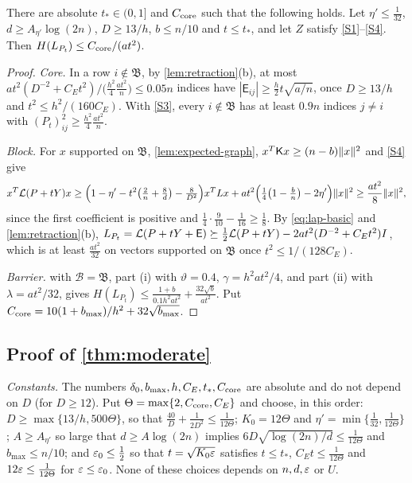 \begin{lemma}\label{lem:seed-graph}
There are absolute $t_*\in(0,1]$ and $C_{\rm core}$ such that the following
holds. Let $\eta'\le\frac1{32}$, $d\ge A_{\eta'}\log(2n)$, $D\ge13/h$,
$b\le n/10$ and $t\le t_*$, and let $Z$ satisfy \ref{S1}--\ref{S4}. Then
$H(L_{P_t})\le C_{\rm core}/(at^2)$.
\end{lemma}

\begin{proof}
\emph{Core.} In a row $i\notin\mathfrak B$, by \cref{lem:retraction}(b), at most
$at^2(D^{-2}+C_Et^2)\big/\bigl(\frac{h^2}4\frac{at^2}n\bigr)\le0.05n$ indices have
$|\mathsf E_{ij}|\ge\frac h2t\sqrt{a/n}$, once $D\ge13/h$ and
$t^2\le h^2/(160C_E)$. With \ref{S3}, every $i\notin\mathfrak B$ has at least
$0.9n$ indices $j\ne i$ with $(P_t)_{ij}^2\ge\frac{h^2}4\frac{at^2}n$.

\emph{Block.} For $x$ supported on $\mathfrak B$, \cref{lem:expected-graph},
$x^T\mathsf Kx\ge(n-b)\lVert x\rVert^2$ and \ref{S4} give
\[
 x^T\mathcal L(P+tY)x\ge\Bigl(1-\eta'-t^2\bigl(\tfrac2n+\tfrac8d\bigr)-\tfrac8{D^2}\Bigr)x^TLx
 +at^2\Bigl(\tfrac14\bigl(1-\tfrac bn\bigr)-2\eta'\Bigr)\lVert x\rVert^2
 \ge\frac{at^2}8\lVert x\rVert^2 ,
\]
since the first coefficient is positive and $\frac14\cdot\frac9{10}-\frac1{16}\ge\frac18$.
By \eqref{eq:lap-basic} and \cref{lem:retraction}(b),
$L_{P_t}=\mathcal L(P+tY+\mathsf E)\succeq\frac12\mathcal L(P+tY)-2at^2(D^{-2}+C_Et^2)I$,
which is at least $\frac{at^2}{32}$ on vectors supported on $\mathfrak B$ once
$t^2\le1/(128C_E)$.

\emph{Barrier.}  with $\mathcal B=\mathfrak B$, part (i) with
$\vartheta=0.4$, $\gamma=h^2at^2/4$, and part (ii) with $\lambda=at^2/32$, gives
$H(L_{P_t})\le\frac{1+b}{0.1h^2at^2}+\frac{32\sqrt b}{at^2}$. Put
$C_{\rm core}=10(1+b_{\max})/h^2+32\sqrt{b_{\max}}$.
\end{proof}

\subsection{Proof of \texorpdfstring{\cref{thm:moderate}}{Theorem}}

\emph{Constants.} The numbers $\delta_0,b_{\max},h,C_E,t_*,C_{\rm core}$ are
absolute and do not depend on $D$ (for $D\ge12$). Put
$\Theta=\max\{2,C_{\rm core},C_E\}$ and choose, in this order: $D\ge\max\{13/h,
500\Theta\}$, so that $\frac{40}D+\frac1{2D^2}\le\frac1{12\Theta}$; $K_0=12\Theta$
and $\eta'=\min\{\frac1{32},\frac1{12\Theta}\}$; $A\ge A_{\eta'}$ so large that
$d\ge A\log(2n)$ implies $6D\sqrt{\log(2n)/d}\le\frac1{12\Theta}$ and
$b_{\max}\le n/10$; and $\varepsilon_0\le\frac12$ so that $t=\sqrt{K_0\varepsilon}$ satisfies
$t\le t_*$, $C_Et\le\frac1{12\Theta}$ and $12\varepsilon\le\frac1{12\Theta}$ for
$\varepsilon\le\varepsilon_0$. None of these choices depends on $n,d,\varepsilon$ or $U$.

